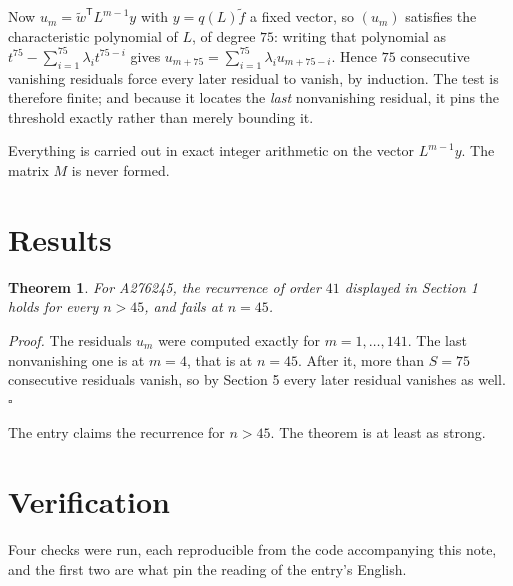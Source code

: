 \documentclass[11pt]{article}
\newtheorem{theorem}{Theorem}
\theoremstyle{definition}
\begin{document}
Now $u_m = \tilde w^{\mathsf T} L^{m-1} y$ with $y = q(L)\tilde f$ a fixed vector, so $(u_m)$ satisfies the characteristic polynomial of $L$, of degree $75$: writing that polynomial as $t^{75} - \sum_{i=1}^{75} \lambda_i t^{75-i}$ gives $u_{m+75} = \sum_{i=1}^{75} \lambda_i u_{m+75-i}$. Hence $75$ consecutive vanishing residuals force every later residual to vanish, by induction. The test is therefore finite; and because it locates the {\itshape last} nonvanishing residual, it pins the threshold exactly rather than merely bounding it.

Everything is carried out in exact integer arithmetic on the vector $L^{m-1}y$. The matrix $M$ is never formed.

\section{Results}

\begin{theorem} For A276245, the recurrence of order $41$ displayed in Section 1 holds for every $n > 45$, and fails at $n = 45$.\end{theorem}

{\itshape Proof.} The residuals $u_m$ were computed exactly for $m = 1,\dots,141$. The last nonvanishing one is at $m = 4$, that is at $n = 45$. After it, more than $S = 75$ consecutive residuals vanish, so by Section 5 every later residual vanishes as well. $\square$

The entry claims the recurrence for $n > 45$. The theorem is at least as strong.

\section{Verification}

Four checks were run, each reproducible from the code accompanying this note, and the first two are what pin the reading of the entry's English.
\end{document}
